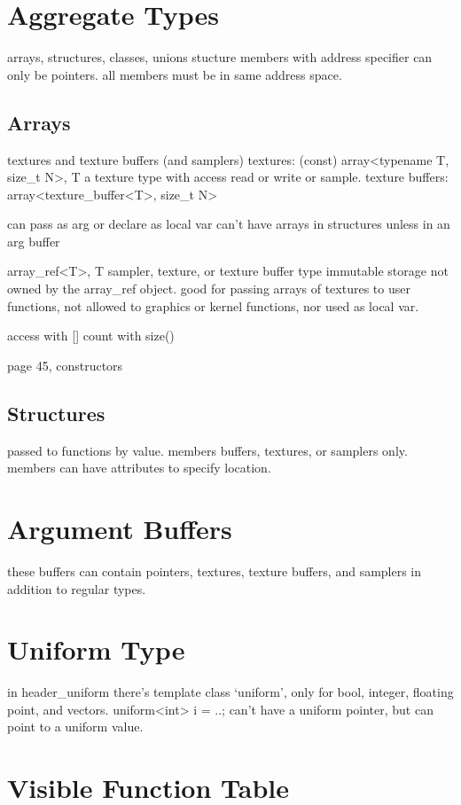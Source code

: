\section{Aggregate Types}

arrays, structures, classes, unions
stucture members with address specifier can only be pointers. all members must be in same address space.

\subsection{Arrays}
textures and texture buffers (and samplers)
textures:
(const) array<typename T, size_t N>, T a texture type with access read or write or sample. 
texture buffers:
array<texture_buffer<T>, size_t N>

can pass as arg or declare as local var
can't have arrays in structures unless in an arg buffer

array_ref<T>, T sampler, texture, or texture buffer type
immutable
storage not owned by the array_ref object.
good for passing arrays of textures to user functions, not allowed to graphics or kernel functions, nor used as local var.

access with []
count with size()

page 45, constructors

\subsection{Structures}

passed to functions by value.
members buffers, textures, or samplers only. members can have attributes to specify location.

\section{Argument Buffers}

these buffers can contain pointers, textures, texture buffers, and samplers in addition to regular types.

\section{Uniform Type}

in header_uniform there's template class `uniform', only for bool, integer, floating point, and vectors. 
uniform<int> i = ..;
can't have a uniform pointer, but can point to a uniform value. 

\section{Visible Function Table}

